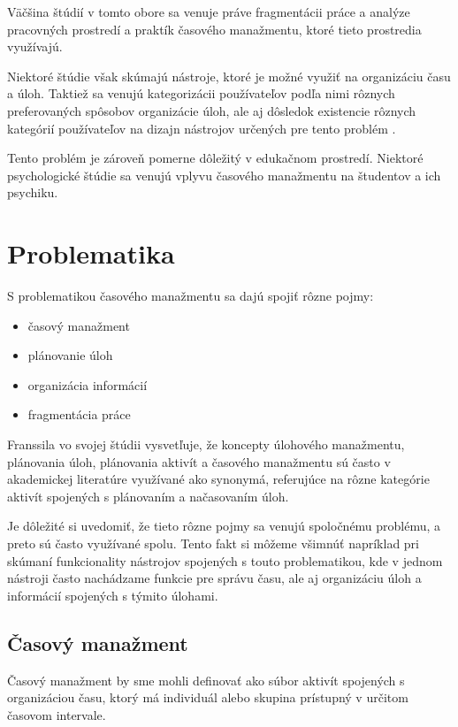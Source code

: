 \documentclass[10pt,slovak,a4paper]{article}
\begin{document}
	Väčšina štúdií v tomto obore \cite{Franssila,NoTask,Blandford} sa venuje práve fragmentácii práce a analýze pracovných prostredí a praktík časového manažmentu, ktoré tieto prostredia využívajú.
	
	Niektoré štúdie \cite{Franssila, Blandford, Haraty} však skúmajú nástroje, ktoré je možné využiť na organizáciu času a úloh. Taktiež sa venujú kategorizácii používateľov podľa nimi rôznych preferovaných spôsobov organizácie úloh, ale aj dôsledok existencie rôznych kategórií používateľov na dizajn nástrojov určených pre tento problém \cite{Haraty}.
	
	Tento problém je zároveň pomerne dôležitý v edukačnom prostredí. Niektoré psychologické štúdie \cite{Macan} sa venujú vplyvu časového manažmentu na študentov a ich psychiku.
	
\section{Problematika}

	S problematikou časového manažmentu sa dajú spojiť rôzne pojmy:
	\begin{itemize}
		\item časový manažment
		\item plánovanie úloh
		\item organizácia informácií
		\item fragmentácia práce
	\end{itemize}

	Franssila vo svojej štúdii\cite{Franssila} vysvetľuje, že koncepty úlohového manažmentu, plánovania úloh, plánovania aktivít a časového manažmentu sú často v akademickej literatúre využívané ako synonymá, referujúce na rôzne kategórie aktivít spojených s plánovaním a načasovaním úloh\cite{Franssila}.
	
	Je dôležité si uvedomiť, že tieto rôzne pojmy sa venujú spoločnému problému, a preto sú často využívané spolu. Tento fakt si môžeme všimnúť napríklad pri skúmaní funkcionality nástrojov spojených s touto problematikou, kde v jednom nástroji často nachádzame funkcie pre správu času, ale aj organizáciu úloh a informácií spojených s týmito úlohami.
	
	\subsection{Časový manažment}
	
		Časový manažment by sme mohli definovať ako súbor aktivít spojených s organizáciou času, ktorý má individuál alebo skupina prístupný v určitom časovom intervale.
		
\end{document}
